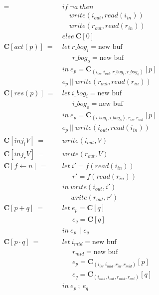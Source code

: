 \documentclass[12pt, letterpaper]{article}
\begin{document}
{\begin{align*}
            =\ 
            &if\ \neg a\ then\\
            &\quad write(i_{out}, read(i_{in}))\\
            &\quad write(r_{out}, read(r_{in}))\\
            &else\ \mathbf{C}[0]\\
         \mathbf{C}[act(p)]\ 
             =\ &
             let\ r\_bog_i = \text{new buf}\\
             &\quad\ \ r\_bog_o = \text{new buf}\\
             &in\ e_p = \mathbf{C}_{(i_{in}, i_{out}, r\_bog_i, r\_bog_o)}[p]\\
             &e_p\ ||\ write(r_{out}, read(r_{in}))
             \\
         \mathbf{C}[res(p)]\ 
             =\ &
             let\ i\_bog_i = \text{new buf}\\
             &\quad\ \ i\_bog_o = \text{new buf}\\
             &in\ e_p = \mathbf{C}_{(i\_bog_i, i\_bog_o), r_{in}, r_{out}}[p]\\
             &e_p\ ||\ write(i_{out}, read(i_{in}))
             \\
         \mathbf{C}[inj_iV]\ 
             =\ &
             write(i_{out}, V)
             \\
         \mathbf{C}[inj_rV]\ 
             =\ &
             write(r_{out}, V)
             \\
         \mathbf{C}[f \leftarrow n]\ 
             =\ &
             let\ i' = f(read(i_{in}))\\
             &\quad\ \ r' = f(read(r_{in}))\\
             &in\ write(i_{out}, i')\\
             &\quad \ write(r_{out}, r')
             \\
         \mathbf{C}[p + q]\ 
             =\ &
             let\ e_p = \mathbf{C}[q]\\
             &\quad\ \ e_q = \mathbf{C}[q]\\
             &in\ e_p\ ||\ e_q
             \\
         \mathbf{C}[p \cdot q]\ 
             =\ &
             let\ i_{mid} = \text{new buf}\\
             &\quad\ \ r_{mid} = \text{new buf}\\
             &\quad\ \ e_p = \mathbf{C}_{(i_{in}, i_{mid}, r_{in}, r_{mid})}[p]\\
             &\quad\ \ e_q = \mathbf{C}_{(i_{mid}, i_{out}, r_{mid}, r_{out})}[q]\\
             &in\ e_p\ ;\ e_q
     \end{align*}
 }
\end{document}
